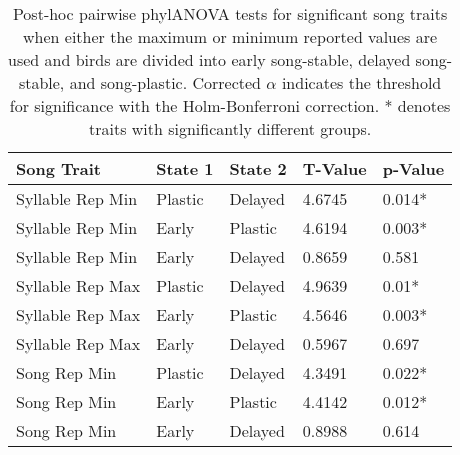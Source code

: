 \documentclass[a4paper,12pt]{article}
\begin{document}
\begin{table}[ht]
\caption{Post-hoc pairwise phylANOVA tests for significant song traits when either the maximum or minimum reported values are used and birds are divided into early song-stable, delayed song-stable, and song-plastic. Corrected $\alpha$ indicates the threshold for significance with the Holm-Bonferroni correction. * denotes traits with significantly different groups.}
\centering
\begin{tabular}{lllll}
  \hline
Song Trait & State 1 & State 2 & T-Value & p-Value \\ 
  \hline
Syllable Rep Min & Plastic & Delayed & 4.6745 & 0.014* \\ 
  Syllable Rep Min & Early & Plastic & 4.6194 & 0.003* \\ 
  Syllable Rep Min & Early & Delayed & 0.8659 & 0.581 \\ \hdashline
  Syllable Rep Max & Plastic & Delayed & 4.9639 & 0.01* \\ 
  Syllable Rep Max & Early & Plastic & 4.5646 & 0.003* \\ 
  Syllable Rep Max & Early & Delayed & 0.5967 & 0.697 \\ \hdashline
  Song Rep Min & Plastic & Delayed & 4.3491 & 0.022* \\ 
  Song Rep Min & Early & Plastic & 4.4142 & 0.012* \\ 
  Song Rep Min & Early & Delayed & 0.8988 & 0.614 \\ 
   \hline
\end{tabular}
\end{table}
\end{document}
